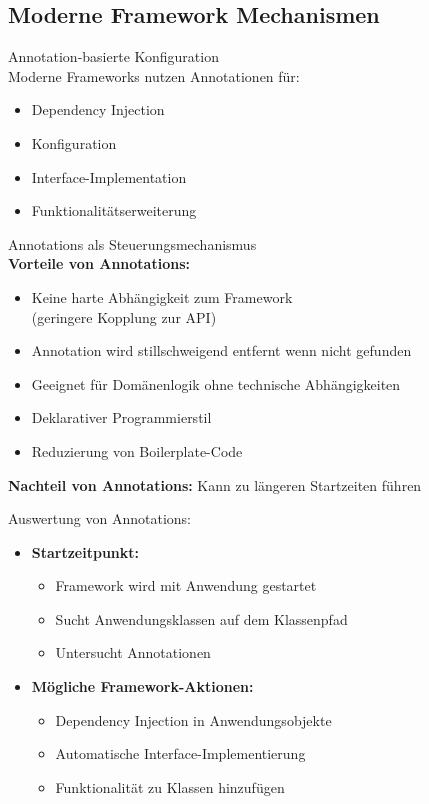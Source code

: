 \subsection{Moderne Framework Mechanismen}



\begin{definition}{Annotation-basierte Konfiguration}\\
Moderne Frameworks nutzen Annotationen für:
\begin{itemize}
    \item Dependency Injection
    \item Konfiguration
    \item Interface-Implementation
    \item Funktionalitätserweiterung
\end{itemize}
\end{definition}

\begin{concept}{Annotations als Steuerungsmechanismus}\\
\textbf{Vorteile von Annotations:}
\begin{itemize}
    \item Keine harte Abhängigkeit zum Framework\\ (geringere Kopplung zur API)
    \item Annotation wird stillschweigend entfernt wenn nicht gefunden
    \item Geeignet für Domänenlogik ohne technische Abhängigkeiten
    \item Deklarativer Programmierstil
    \item Reduzierung von Boilerplate-Code
\end{itemize}

\textbf{Nachteil von Annotations:} Kann zu längeren Startzeiten führen
\end{concept}

\begin{theorem}{Auswertung von Annotations:}
\begin{itemize}
    \item \textbf{Startzeitpunkt:}
    \begin{itemize}
        \item Framework wird mit Anwendung gestartet
        \item Sucht Anwendungsklassen auf dem Klassenpfad
        \item Untersucht Annotationen
    \end{itemize}
    \item \textbf{Mögliche Framework-Aktionen:}
    \begin{itemize}
        \item Dependency Injection in Anwendungsobjekte
        \item Automatische Interface-Implementierung
        \item Funktionalität zu Klassen hinzufügen
    \end{itemize}
\end{itemize}
\end{theorem}

